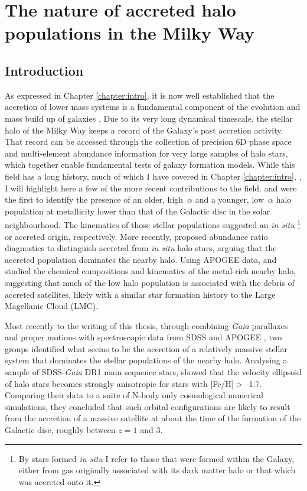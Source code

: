 \chapter{The nature of accreted halo populations in the Milky Way}
\label{chapter:highe}
\section{Introduction} \label{intro}

As expressed in Chapter \ref{chapter:intro}, it is now well established that the accretion of lower mass systems is a fundamental component of the evolution and mass build up of galaxies \citep{1991ApJ...379...52W}.  Due to its very long dynamical
timescale, the stellar halo of the Milky Way keeps a record of the
Galaxy's past accretion activity.  That record can be accessed
through the collection of precision 6D phase space and multi-element
abundance information for very large samples of halo stars, which
together enable fundamental tests of galaxy formation models.  While
this field has a long history, much of which I have covered in Chapter \ref{chapter:intro}, 
\citep[e.g.,][]{1962ApJ...136..748E,1978ApJ...225..357S}, I will highlight here a few of the more recent contributions to the field.  \citet{2010A&A...511L..10N} and \citet{2012A&A...538A..21S}
were the first to identify the presence of an older, high~$\alpha$
and a younger, low~$\alpha$ halo population at metallicity lower
than that of the Galactic disc in the solar neighbourhood.
The kinematics of those stellar populations suggested an {\it in
situ} \footnote{ By stars formed {\it in situ} I refer to those
that were formed within the Galaxy, either from gas originally
associated with its dark matter halo or that which was accreted
onto it.} or accreted origin, respectively. More
recently, \citet{2015MNRAS.453..758H} proposed abundance ratio
diagnostics to distinguish accreted from {\it in situ} halo stars,
arguing that the accreted population dominates the nearby halo.
Using APOGEE data, \citet{2018ApJ...852...50F} and
\citet{2018ApJ...852...49H} studied the chemical compositions and
kinematics of the metal-rich nearby halo, suggesting that much of
the low \mgfe{} halo population is associated with the debris of
accreted satellites, likely with a similar star formation history
to the Large Magellanic Cloud (LMC).


Most recently to the writing of this thesis, through combining \emph{Gaia} parallaxes and proper motions
\citep{2016arXiv160904303L,2018arXiv180409365G} with spectroscopic
data from SDSS \citep{2000AJ....120.1579Y} and APOGEE
\citep{2015arXiv150905420M}, two groups identified what seems
to be the accretion of a relatively massive stellar system that
dominates the stellar populations of the nearby halo.  Analysing a
sample of SDSS-\emph{Gaia} DR1 main sequence stars,
\citet{2018MNRAS.478..611B} showed that the velocity ellipsoid of
halo stars becomes strongly anisotropic for stars with [Fe/H]$>$--1.7.
Comparing their data to a suite of N-body only cosmological
numerical simulations, they concluded that such orbital configurations
are likely to result from the accretion of a massive satellite at
about the time of the formation of the Galactic disc, roughly between
$z=1$ and 3.

